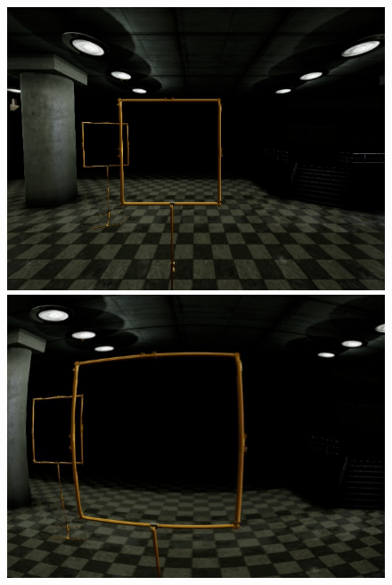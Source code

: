 \begin{figure}[htbp]
	\begin{minipage}{0.33\textwidth}
		\includegraphics[width=\textwidth]{fig/gate_example}
	\end{minipage}
\begin{minipage}{0.33\textwidth}
	\includegraphics[width=\textwidth]{fig/gate_example_distorted}
\end{minipage}
\begin{minipage}{0.33\textwidth}

\end{minipage}
\end{figure}
